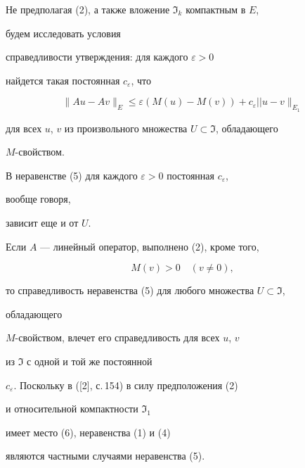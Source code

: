 Не предполагая (2), а также вложение $\Im_k$ компактным в $E$, 


будем исследовать условия  


справедливости утверждения: для каждого $\varepsilon>0$ 


найдется такая постоянная $c_\varepsilon$, что 


\begin{equation} 


\|A u-A v\|_E\le\varepsilon(M(u)-M(v))+c_\varepsilon 


||u-v\|_{E_1} 


\end{equation} 


для всех $u$, $v$ из произвольного множества $U\subset\Im$, обладающего 


$M$-свойством. 


 


\begin{note} 


В неравенстве (5) для каждого $\varepsilon>0$ постоянная $c_\varepsilon$, 


вообще говоря, 


зависит еще и от $U$. 


\end{note} 


 


Если $A$ --- линейный оператор, выполнено (2), кроме того, 


\begin{equation} 


M(v)>0\quad (v\ne0), 


\end{equation} 


то справедливость неравенства (5) для любого множества $U\subset\Im$, 


обладающего 


$M$-свойством, влечет его справедливость для всех $u$, $v$ 


из $\Im$ с одной и той же постоянной  


$c_\varepsilon$. Поскольку в ([2], с.\,154) в силу предположения (2)  


и относительной компактности $\Im_1$ 


имеет место (6), неравенства (1) и (4)  


являются частными случаями неравенства (5).  


